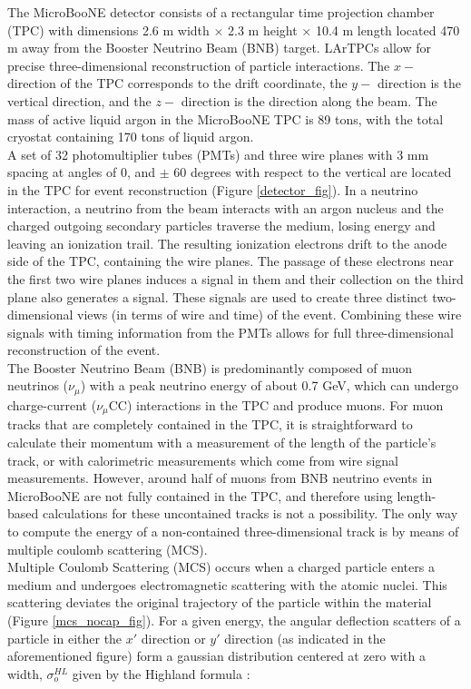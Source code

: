\documentclass[a4paper,11pt]{article}
\begin{document}
The MicroBooNE detector\cite{ub_detectorpaper} consists of a rectangular time projection chamber (TPC) with dimensions 2.6 m width $\times$ 2.3 m height $\times$ 10.4 m length located 470 m away from the Booster Neutrino Beam (BNB) target. LArTPCs allow for precise three-dimensional reconstruction of particle interactions. The $x-$ direction of the TPC corresponds to the drift coordinate, the $y-$ direction is the vertical direction, and the $z-$ direction is the direction along the beam. The mass of active liquid argon in the MicroBooNE TPC is 89 tons, with the total cryostat containing 170 tons of liquid argon.\\

A set of 32 photomultiplier tubes (PMTs) and three wire planes with 3 mm spacing at angles of 0, and $\pm$ 60 degrees with respect to the vertical are located in the TPC for event reconstruction (Figure \ref{detector_fig}). In a neutrino interaction, a neutrino from the beam interacts with an argon nucleus and the charged outgoing secondary particles traverse the medium, losing energy and leaving an ionization trail. The resulting ionization electrons drift to the anode side of the TPC, containing the wire planes. The passage of these electrons near the first two wire planes induces a signal in them and their collection on the third plane also generates a signal. These signals are used to create three distinct two-dimensional views (in terms of wire and time) of the event. Combining these wire signals with timing information from the PMTs allows for full three-dimensional reconstruction of the event.\\

The Booster Neutrino Beam (BNB) is predominantly composed of muon neutrinos ($\nu_\mu$) with a peak neutrino energy of about 0.7 GeV, which can undergo charge-current ($\nu_\mu$CC) interactions in the TPC and produce muons. For muon tracks that are completely contained in the TPC, it is straightforward to calculate their momentum with a measurement of the length of the particle's track, or with calorimetric measurements which come from wire signal measurements. However, around half of muons from BNB neutrino events in MicroBooNE are not fully contained in the TPC, and therefore using length-based calculations for these uncontained tracks is not a possibility. The only way to compute the energy of a non-contained three-dimensional track is by means of multiple coulomb scattering (MCS). \\

Multiple Coulomb Scattering (MCS) occurs when a charged particle enters a medium and undergoes electromagnetic scattering with the atomic nuclei. This scattering deviates the original trajectory of the particle within the material (Figure \ref{mcs_nocap_fig}). For a given energy, the angular deflection scatters of a particle in either the $x'$ direction or $y'$ direction (as indicated in the aforementioned figure) form a gaussian distribution centered at zero with a width, $\sigma_o^{HL}$ given by the Highland formula \cite{highland}: 
\end{document}
